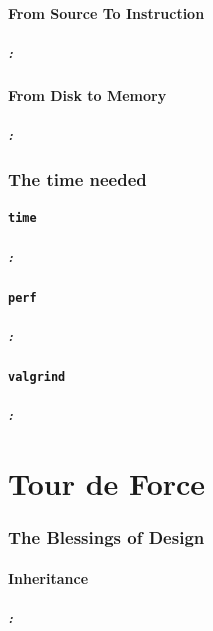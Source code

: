 \documentclass[9pt,xcolor=table]{beamer}
\begin{document}
\subsection{From Source To Instruction}
\begin{frame}
\frametitle{\insertsectionhead{}: \insertsubsection{}}
\end{frame}

\subsection{From Disk to Memory}
\begin{frame}
\frametitle{\insertsectionhead{}: \insertsubsection{}}
\end{frame}


\section[Measurement]{The time needed}
\subsection{\texttt{time}}
\begin{frame}
\frametitle{\insertsectionhead{}: \insertsubsectionhead{}}
\end{frame}

\subsection{\texttt{perf}}
\begin{frame}
\frametitle{\insertsectionhead{}: \insertsubsectionhead{}}
\end{frame}

\subsection{\texttt{valgrind}}
\begin{frame}
\frametitle{\insertsectionhead{}: \insertsubsectionhead{}}
\end{frame}


\part{Tour de Force}
\section{The Blessings of Design}
\subsection{Inheritance}
\begin{frame}
\frametitle{\insertsectionhead{}: \insertsubsectionhead{}}
\end{frame}
\end{document}
